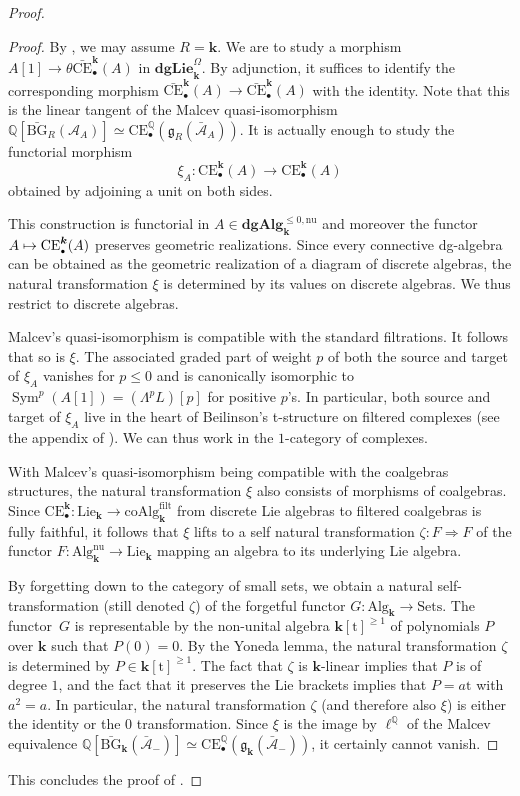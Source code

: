 \documentclass[JEP,XML,SOM,Unicode,NoEqCountersInSection]{cedram}
\let\mathcal\mathscr
\let\autoref\Cref
\newcommand\mto{\mathchoice{\longmapsto}{\mapsto}{\mapsto}{\mapsto}}
\let\widebar\bar
\newcommand{\sbullet}{{\scriptscriptstyle\bullet}}
\theoremstyle{definition}
\newcommand{\Q}{\mathbb{Q}}
\newcommand{\Alg}{\mathbf{Alg}}
\newcommand{\dgLie}{\mathbf{dgLie}}
\newcommand{\dgAlg}{\mathbf{dgAlg}}
\DeclareMathOperator{\Sym}{Sym}
\renewcommand{\k}{{\boldsymbol{k}}}
\newcommand{\ellQ}{\operatorname{\ell^\Q}}
\newcommand{\Ac}{\mathcal{A}}
\newcommand{\bAc}{\widebar{\mathcal{A}}}
\newcommand{\bCE}{\widebar{\mathrm{CE}}}
\newcommand{\CE}{\mathrm{CE}}
\newcommand{\g}{\mathfrak{g}}
\newcommand{\bBG}{\widebar{\mathrm{BG}}}
\begin{document}
\begin{proof}
\begin{proof}
By \autoref{rmq:Risk}, we may assume $R = \k$.
\renewcommand{\Alg}{\mathrm{Alg}}
We are to study a morphism $ A[1] \to \theta \bCE^\k_\sbullet(A)$ in $\dgLie^\Omega_\k$.
By adjunction, it suffices to identify the corresponding morphism $\bCE_\sbullet^\k(A) \to \bCE_\sbullet^\k(A)$ with the identity. Note that this is the linear tangent of the Malcev quasi-isomorphism $\Q[\bBG_R(\Ac_A)] \simeq \CE_\sbullet^\Q(\g_R(\bAc_A))$. It is actually enough to study the functorial morphism
\[
\xi_A \colon \CE^\k_\sbullet(A) \to \CE^\k_\sbullet(A)
\]
obtained by adjoining a unit on both sides.

This construction is functorial in $A \in \dgAlg_\k^{\leq 0, \mathrm{nu}}$ and moreover the functor $A \mto \CE_\sbullet^\k(A)$ preserves geometric realizations.
Since every connective dg-algebra can be obtained as the geometric realization of a diagram of discrete algebras, the natural transformation $\xi$ is determined by its values on discrete algebras. We thus restrict to discrete algebras.

Malcev's quasi-isomorphism is compatible with the standard filtrations. It follows that so is $\xi$. The associated graded part of weight $p$ of both the source and target of $\xi_A$ vanishes for $p \leq 0$ and is canonically isomorphic to $\Sym^p(A[1]) = (\Lambda^p L)[p]$ for positive $p$'s. In particular, both source and target of $\xi_A$ live in the heart of Beilinson's t-structure on filtered complexes (see the appendix of \cite{beilinson:perv}). We can thus work in the $1$-category of complexes.

With Malcev's quasi-isomorphism being compatible with the coalgebras structures, the natural transformation $\xi$ also consists of morphisms of coalgebras. Since $\CE^\k_\sbullet \colon \mathrm{Lie}_\k \to \mathrm{coAlg}^\mathrm{filt}_\k$ from discrete Lie algebras to filtered coalgebras is fully faithful, it follows that $\xi$ lifts to a self natural transformation $\zeta \colon F \Rightarrow F$ of the functor $F \colon \mathrm{Alg}_\k^{\mathrm{nu}} \to \mathrm{Lie}_\k$ mapping an algebra to its underlying Lie algebra.

By forgetting down to the category of small sets, we obtain a natural self-trans\-formation (still denoted $\zeta$) of the forgetful functor $G \colon \Alg_\k \to \mathrm{Sets}$. The functor~$G$ is representable by the non-unital algebra $\k[\mathrm{t}]^{\geq 1}$ of polynomials $P$ over $\k$ such that $P(0) = 0$. By the Yoneda lemma, the natural transformation $\zeta$ is determined by $P \in \k[\mathrm{t}]^{\geq 1}$.
The fact that $\zeta$ is $\k$-linear implies that $P$ is of degree $1$, and the fact that it preserves the Lie brackets implies that $P = a\mathrm{t}$ with $a^2 = a$.
In particular, the natural transformation $\zeta$ (and therefore also $\xi$) is either the identity or the $0$ transformation.
Since $\xi$ is the image by $\ellQ$ of the Malcev equivalence $\Q[\bBG_\k(\bAc_-)] \simeq \CE_\sbullet^\Q(\g_\k(\bAc_-))$, it certainly cannot vanish.
\end{proof}

This concludes the proof of \autoref{thm:compLQT}.
\end{proof}

\backmatter


\end{document}
